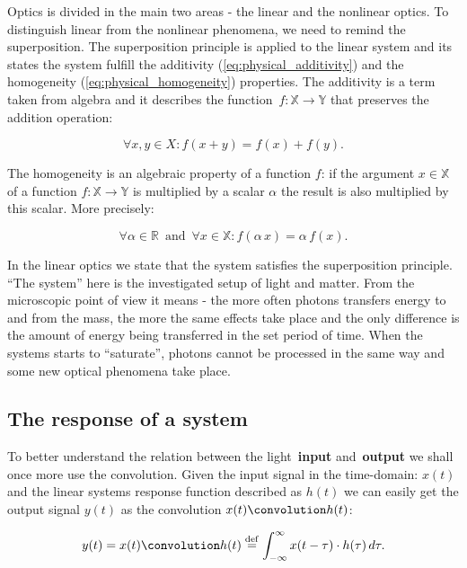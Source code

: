 \documentclass[12pt,twoside,a4paper]{article}
\numberwithin{equation}{subsection}
\numberwithin{figure}{subsection}
\begin{document}
Optics is divided in the main two areas - the linear and the nonlinear optics. To distinguish linear from the nonlinear phenomena,
we need to remind the superposition. The superposition principle is applied to the linear system and its states the system fulfill the
additivity (\ref{eq:physical_additivity}) and the homogeneity (\ref{eq:physical_homogeneity}) properties. The additivity is a term taken
from algebra and it describes the function~$ f : \mathbb{X} \to \mathbb{Y}$ that preserves the addition operation:

\begin{equation} \label{eq:physical_additivity}
  \forall x, y \in X : f(x + y) = f(x) + f(y) .
\end{equation}

The homogeneity is an algebraic property of a function $f$: if the argument $x \in \mathbb{X} $ of a function $f : \mathbb{X} \to \mathbb{Y}
$ is multiplied by a scalar $ \alpha $ the result is also multiplied by this scalar. More precisely:

\begin{equation} \label{eq:physical_homogeneity}
  \forall \alpha \in \mathbb{R} \, \text{ and } \, \forall x \in \mathbb{X} : f(\alpha \, x) = \alpha \, f(x) .
\end{equation}

In the linear optics we state that the system satisfies the superposition principle. ``The system'' here is the investigated setup of light
and matter. From the microscopic point of view it means - the more often photons transfers energy to and from the mass, the more the same
effects take place and the only difference is the amount of energy being transferred in the set period of time. When the systems starts to
``saturate'', photons cannot be processed in the same way and some new optical phenomena take place.

\subsection{The response of a system} \label{chap:physical_systemresponse}

To better understand the relation between the light~\textbf{input} and~\textbf{output} we shall once more use the convolution.
Given the input signal in the time-domain: $ x(t) $ and the linear systems response function described as $ h(t) $ we can easily get the
output signal $ y(t) $ as the convolution $ x(t) \convolution h(t) $:

\begin{equation} \label{eq:physical_response}
  y(t) = x(t) \convolution h(t) \stackrel{\mathrm{def}}{=} \int_{ - \infty}^{ \infty} x( t - \tau ) \cdot h(\tau) \, d\tau .
\end{equation}
\end{document}
